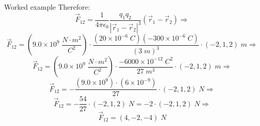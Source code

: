 {\begin{frame}{Worked example}
Therefore:
\begin{equation*}
  \displaystyle
   \vec{F}_{12} = \frac{1}{4\pi\epsilon_0} \frac{q_1 q_2}{|\vec{r}_{1}-\vec{r}_{2}|^{3}} (\vec{r}_{1}-\vec{r}_{2}) \Rightarrow
\end{equation*}
\begin{equation*}
  \displaystyle
    \vec{F}_{12} =
              ( 9.0 \times 10^9 \; \frac{N \cdot m^2}{C^2}) \cdot
              \frac{(20 \times 10^{-6} \; C) (-300 \times 10^{-6} \; C)}{(3\;m)^3} \cdot (-2, 1, 2) \; m \Rightarrow
\end{equation*}
\begin{equation*}
  \displaystyle
    \vec{F}_{12} =
              ( 9.0 \times 10^9 \; \frac{N \cdot m^2}{C^2}) \cdot
              \frac{-6000 \times 10^{-12} \; C^2}{27\;m^3} \cdot (-2, 1, 2) \; m \Rightarrow
\end{equation*}
\begin{equation*}
  \displaystyle
    \vec{F}_{12} =
        - \frac{(9.0 \times 10^9) \cdot (6 \times 10^{-9})}{27} \cdot (-2, 1, 2) \; N \Rightarrow
\end{equation*}
\begin{equation*}
  \displaystyle
    \vec{F}_{12} =
        - \frac{54}{27} \cdot (-2, 1, 2) \; N =  -2 \cdot (-2, 1, 2) \; N \Rightarrow
\end{equation*}
\begin{equation*}
  \displaystyle
    \vec{F}_{12} = (4, -2, -4) \; N
\end{equation*}

\end{frame}


} %


%
%
%

